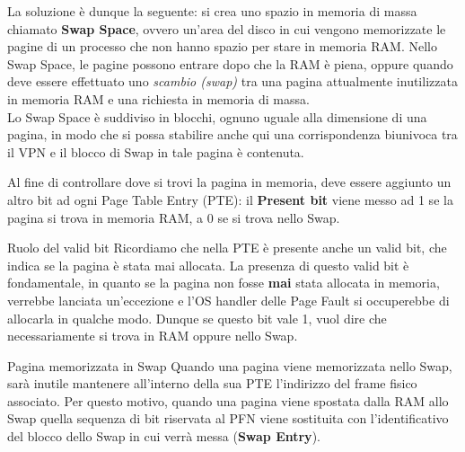 \documentclass[12pt]{report}
\begin{document}
	La soluzione è dunque la seguente: si crea uno spazio in memoria di massa chiamato \textbf{Swap Space}, ovvero un'area del disco in cui vengono memorizzate le pagine di un processo che non hanno spazio per stare in memoria RAM. Nello Swap Space, le pagine possono entrare dopo che la RAM è piena, oppure quando deve essere effettuato uno \textit{scambio (swap)} tra una pagina attualmente inutilizzata in memoria RAM e una richiesta in memoria di massa.\\
	Lo Swap Space è suddiviso in blocchi, ognuno uguale alla dimensione di una pagina, in modo che si possa stabilire anche qui una corrispondenza biunivoca tra il VPN e il blocco di Swap in tale pagina è contenuta.
	\smallbreak
	
	Al fine di controllare dove si trovi la pagina in memoria, deve essere aggiunto un altro bit ad ogni Page Table Entry (PTE): il \textbf{Present bit} viene messo ad 1 se la pagina si trova in memoria RAM, a 0 se si trova nello Swap.
	\begin{osservazione}{Ruolo del valid bit}{}
		Ricordiamo che nella PTE è presente anche un valid bit, che indica se la pagina è stata mai allocata. La presenza di questo valid bit è fondamentale, in quanto se la pagina non fosse \textbf{mai} stata allocata in memoria, verrebbe lanciata un'eccezione e l'OS handler delle Page Fault si occuperebbe di allocarla in qualche modo. Dunque se questo bit vale 1, vuol dire che necessariamente si trova in RAM oppure nello Swap.
	\end{osservazione}
	
	\begin{osservazione}{Pagina memorizzata in Swap}{}
		Quando una pagina viene memorizzata nello Swap, sarà inutile mantenere all'interno della sua PTE l'indirizzo del frame fisico associato. Per questo motivo, quando una pagina viene spostata dalla RAM allo Swap quella sequenza di bit riservata al PFN viene sostituita con l'identificativo del blocco dello Swap in cui verrà messa (\textbf{Swap Entry}).
	\end{osservazione}
	
\end{document}
